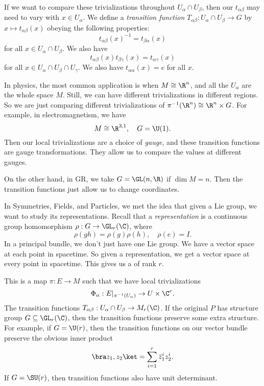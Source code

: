 \documentclass[a4paper]{article}
\begin{document}
If we want to compare these trivializations throughout $U_\alpha \cap U_\beta$, then our $t_{\alpha\beta}$ may need to vary with $x \in U_\alpha$. We define a \emph{transition function} $T_{\alpha\beta}: U_\alpha \cap U_\beta \to G$ by $x \mapsto t_{\alpha\beta}(x)$ obeying the following properties:
\[
  t_{\alpha\beta}(x)^{-1} = t_{\beta\alpha}(x)
\]
for all $x \in U_\alpha \cap U_\beta$. We also have
\[
  t_{\alpha\beta}(x) t_{\beta\gamma}(x) = t_{\alpha\gamma}(x)
\]
for all $x \in U_\alpha \cap U_\beta \cap U_\gamma$. We also have $t_{\alpha\alpha}(x) = e$ for all $x$.

In physics, the most common application is when $M \cong \R^n$, and all the $U_\alpha$ are the whole space $M$. Still, we can have different trivializations in different regions. So we are just comparing different trivializations of $\pi^{-1}(\R^n) \cong \R^n \times G$. For example, in electromagnetism, we have
\[
  M \cong \R^{3, 1},\quad G = \U(1).
\]
Then our local trivializations are a choice of \emph{gauge}, and these transition functions are gauge transformations. They allow us to compare the values at different gauges.

On the other hand, in GR, we take $G = \GL(n, \R)$ if $\dim M = n$. Then the transition functions just allow us to change coordinates.

In Symmetries, Fields, and Particles, we met the idea that given a Lie group, we want to study its representations. Recall that a \emph{representation} is a continuous group homomorphism $\rho: G \to \GL_r(\C)$, where
\[
  \rho(gh) = \rho(g) \rho(h),\quad \rho(e) = I.
\]
In a principal bundle, we don't just have one Lie group. We have a vector space at each point in spacetime. So given a representation, we get a vector space at every point in spacetime. This gives us a  of rank $r$.

This is a map $\pi: E \to M$ such that we have local trivializations
\[
  \Phi_\alpha: E|_{\pi^{-1}(U_\alpha)} \to U \times \C^r.
\]
The transition functions $T_{\alpha\beta}: U_\alpha \cap U_\beta \to M_r(\C)$. If the original $P$ has structure group $G \subseteq \GL_r(\C)$, then the transition functions preserve some extra structure. For example, if $G = \U(r)$, then the transition functions on our vector bundle preserve the obvious inner product
\[
  \bra z_1, z_2\ket = \sum_{i = 1}^r \bar{z}_1^i z_2^i.
\]
If $G = \SU(r)$, then transition functions also have unit determinant.

\printindex
\end{document}
